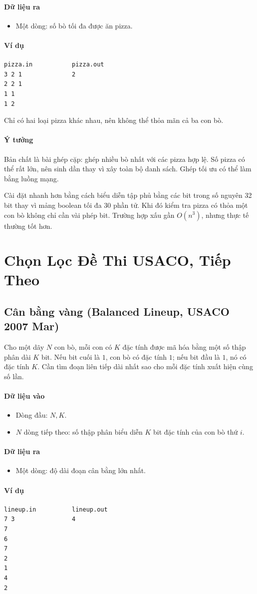 \documentclass[11pt]{article}
\newcommand{\problem}[1]{\subsection{#1}}
\newcommand{\iosec}[1]{\paragraph{#1}}
\newcommand{\bigO}[1]{\ensuremath{O(#1)}}
\begin{document}
\iosec{Dữ liệu ra}
\begin{itemize}
  \item Một dòng: số bò tối đa được ăn pizza.
\end{itemize}

\iosec{Ví dụ}
\begin{verbatim}
pizza.in           pizza.out
3 2 1              2
2 2 1
1 1
1 2
\end{verbatim}

Chỉ có hai loại pizza khác nhau, nên không thể thỏa mãn cả ba con bò.

\iosec{Ý tưởng}
Bản chất là bài ghép cặp: ghép nhiều bò nhất với các pizza hợp lệ. Số pizza có thể rất lớn, nên sinh dần thay vì xây toàn bộ danh sách. Ghép tối ưu có thể làm bằng luồng mạng.

Cài đặt nhanh hơn bằng cách biểu diễn tập phủ bằng các bit trong số nguyên 32 bit thay vì mảng boolean tối đa \(30\) phần tử. Khi đó kiểm tra pizza có thỏa một con bò không chỉ cần vài phép bit. Trường hợp xấu gần \(\bigO{n^3}\), nhưng thực tế thường tốt hơn.

\section{Chọn Lọc Đề Thi USACO, Tiếp Theo}

\problem{Cân bằng vàng (Balanced Lineup, USACO 2007 Mar)}

Cho một dãy \(N\) con bò, mỗi con có \(K\) đặc tính được mã hóa bằng một số thập phân dài \(K\) bit. Nếu bit cuối là \(1\), con bò có đặc tính \(1\); nếu bit đầu là \(1\), nó có đặc tính \(K\). Cần tìm đoạn liên tiếp dài nhất sao cho mỗi đặc tính xuất hiện cùng số lần.

\iosec{Dữ liệu vào}
\begin{itemize}
  \item Dòng đầu: \(N,K\).
  \item \(N\) dòng tiếp theo: số thập phân biểu diễn \(K\) bit đặc tính của con bò thứ \(i\).
\end{itemize}

\iosec{Dữ liệu ra}
\begin{itemize}
  \item Một dòng: độ dài đoạn cân bằng lớn nhất.
\end{itemize}

\iosec{Ví dụ}
\begin{verbatim}
lineup.in          lineup.out
7 3                4
7
6
7
2
1
4
2
\end{verbatim}
\end{document}

